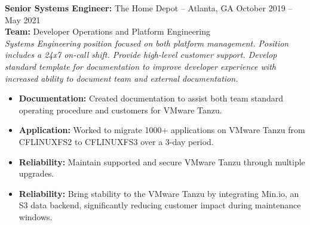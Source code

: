 \documentclass[11pt]{article}       %
\begin{document}
\begin{description}
\item\textbf{Senior Systems Engineer:} {The Home Depot} -- Atlanta, GA \hfill October 2019 -- May 2021 \\
\textbf{Team:} Developer Operations and Platform Engineering \\
\textit{Systems Engineering position focused on both platform management. Position includes a 24x7 on-call shift. Provide high-level customer support. Develop standard template for documentation to improve developer experience with increased ability to document team and external documentation.} \\
\vspace{-6.5pt}
\begin{itemize}
  \item \textbf{Documentation:} Created documentation to assist both team standard operating procedure and customers for VMware Tanzu.
  \item \textbf{Application:} Worked to migrate 1000+ applications on VMware Tanzu from CFLINUXFS2 to CFLINUXFS3 over a 3-day period.
  \item \textbf{Reliability:} Maintain supported and secure VMware Tanzu through multiple upgrades.
  \item \textbf{Reliability:} Bring stability to the VMware Tanzu by integrating Min.io, an S3 data backend, significantly reducing customer impact during maintenance windows. 
\end{itemize}
\end{description}
\end{document}
